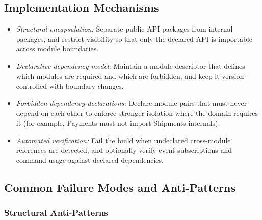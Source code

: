 \subsection*{Implementation Mechanisms}
\begin{itemize}[itemsep=8pt,topsep=2pt]
  \item \emph{Structural encapsulation:} Separate public API packages from internal packages, and restrict visibility so that only the declared API is importable across module boundaries.
  \item \emph{Declarative dependency model:} Maintain a module descriptor that defines which modules are required and which are forbidden, and keep it version-controlled with boundary changes.
  \item \emph{Forbidden dependency declarations:} Declare module pairs that must never depend on each other to enforce stronger isolation where the domain requires it (for example, Payments must not import Shipments internals).
  \item \emph{Automated verification:} Fail the build when undeclared cross-module references are detected, and optionally verify event subscriptions and command usage against declared dependencies.
\end{itemize}

\subsection*{Common Failure Modes and Anti-Patterns}

\subsubsection*{Structural Anti-Patterns}

